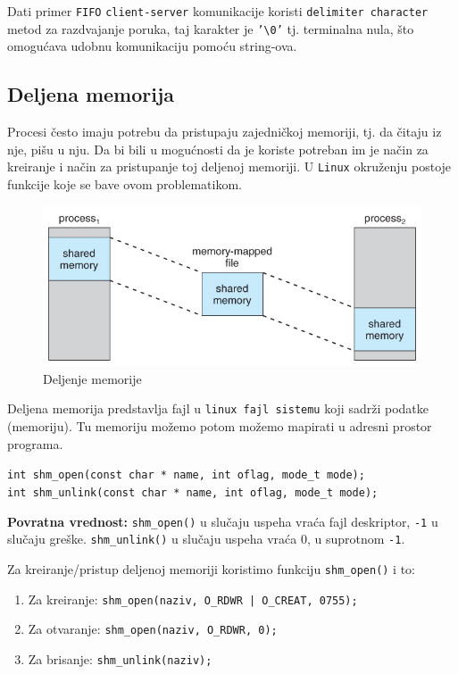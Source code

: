 \documentclass[a4paper, 11pt, twoside]{article}
\begin{document}
Dati primer \texttt{FIFO} \texttt{client-server} komunikacije koristi \texttt{delimiter character} metod za razdvajanje poruka, taj karakter je \texttt{'\textbackslash0'} tj. terminalna nula, što omogućava udobnu komunikaciju pomoću string-ova. 

\newpage

\subsection{Deljena memorija}
Procesi često imaju potrebu da pristupaju zajedničkoj memoriji, tj. da čitaju iz nje, pišu u nju. 
Da bi bili u mogućnosti da je koriste potreban im je način za kreiranje i način za pristupanje toj deljenoj memoriji. U \texttt{Linux} okruženju postoje funkcije koje se bave ovom problematikom.

\begin{figure}[h]
	\centering
	\includegraphics[width=.7\textwidth]{shm.jpg} %
	\caption{Deljenje memorije}
	\label{fig:shm}
\end{figure}

Deljena memorija predstavlja fajl u \texttt{linux fajl sistemu} koji sadrži podatke (memoriju). Tu memoriju možemo potom možemo mapirati u adresni prostor programa. 

\begin{center}
	\texttt{int shm\_open(const char * name, int oflag, mode\_t mode);} \\
	\texttt{int shm\_unlink(const char * name, int oflag, mode\_t mode);}
\end{center}
\textbf{Povratna vrednost:} \texttt{shm\_open()} u slučaju uspeha vraća fajl deskriptor, \texttt{-1} u slučaju greške. \texttt{shm\_unlink()} u slučaju uspeha vraća 0, u suprotnom \texttt{-1}.

Za kreiranje/pristup deljenoj memoriji koristimo funkciju \texttt{shm\_open()} i to: 
\vspace{-2mm} 
\begin{enumerate}[1)]
	\item{Za kreiranje: \texttt{shm\_open(naziv, O\_RDWR | O\_CREAT, 0755);}}
	\item{Za otvaranje: \texttt{shm\_open(naziv, O\_RDWR, 0);}}
	\item{Za brisanje: \texttt{shm\_unlink(naziv);}}
\end{enumerate}
\vspace{-1mm} 
\end{document}
